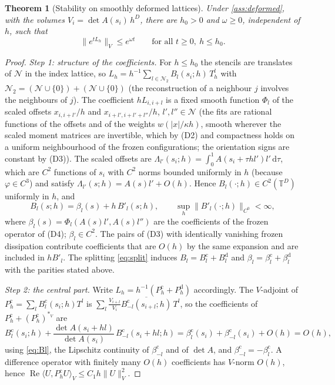 \documentclass[11pt,a4paper]{article}
\theoremstyle{plain}
\newtheorem{theorem}{Theorem}[section]
\theoremstyle{definition}
\theoremstyle{remark}
\numberwithin{equation}{section}
\newcommand{\T}{\mathbb{T}}
\newcommand{\dd}{\mathrm{d}}
\renewcommand{\Re}{\operatorname{Re}}
\begin{document}
\begin{theorem}[Stability on smoothly deformed lattices]\label{thm:deformed}
Under \cref{ass:deformed}, with the volumes $V_i=\det A(s_i)\,h^D$, there are $h_0>0$ and $\omega\ge0$, independent of $h$, such that
\begin{equation}\label{eq:deformed}
\|e^{tL_h}\|_V\le e^{\omega t}\qquad\text{for all }t\ge0,\ h\le h_0 .
\end{equation}
\end{theorem}

\begin{proof}
\emph{Step 1: structure of the coefficients.} For $h\le h_0$ the stencils are translates of $\mathcal N$ in the index lattice, so $L_h=h^{-1}\sum_{l\in\mathcal N_2}B_l(s_i;h)\,T^l_h$ with $\mathcal N_2=(\mathcal N\cup\{0\})+(\mathcal N\cup\{0\})$ (the reconstruction of a neighbour $j$ involves the neighbours of $j$). The coefficient $hL_{i,i+l}$ is a fixed smooth function $\Phi_l$ of the scaled offsets $x_{i,i+l'}/h$ and $x_{i+l',i+l'+l''}/h$, $l',l''\in\mathcal N$ (the fits are rational functions of the offsets and of the weights $w(|x|/\kappa h)$, smooth wherever the scaled moment matrices are invertible, which by (D2) and compactness holds on a uniform neighbourhood of the frozen configurations; the orientation signs are constant by (D3)). The scaled offsets are $\Lambda_{l'}(s_i;h)=\int_0^1A(s_i+\tau hl')l'\,\dd\tau$, which are $C^2$ functions of $s_i$ with $C^2$ norms bounded uniformly in $h$ (because $\varphi\in C^3$) and satisfy $\Lambda_{l'}(s;h)=A(s)l'+O(h)$. Hence $B_l(\cdot;h)\in C^2(\T^D)$ uniformly in $h$, and
\begin{equation}\label{eq:Bl}
B_l(s;h)=\beta_l(s)+h\,B'_l(s;h),\qquad \sup_h\|B'_l(\cdot;h)\|_{C^0}<\infty,
\end{equation}
where $\beta_l(s)=\Phi_l(A(s)l',A(s)l'')$ are the coefficients of the frozen operator of (D4); $\beta_l\in C^2$. The pairs of (D3) with identically vanishing frozen dissipation contribute coefficients that are $O(h)$ by the same expansion and are included in $hB'_l$. The splitting \eqref{eq:split} induces $B_l=B^{\mathrm c}_l+B^{\mathrm d}_l$ and $\beta_l=\beta^{\mathrm c}_l+\beta^{\mathrm d}_l$ with the parities stated above.

\emph{Step 2: the central part.} Write $L_h=h^{-1}(P^{\mathrm c}_h+P^{\mathrm d}_h)$ accordingly. The $V$-adjoint of $P^{\mathrm c}_h=\sum_lB^{\mathrm c}_l(s_i;h)T^l$ is $\sum_l\frac{V_{i+l}}{V_i}\overline{B^{\mathrm c}_{-l}(s_{i+l};h)}\,T^l$, so the coefficients of $P^{\mathrm c}_h+(P^{\mathrm c}_h)^{*_V}$ are
\[
B^{\mathrm c}_l(s_i;h)+\frac{\det A(s_i+hl)}{\det A(s_i)}\,B^{\mathrm c}_{-l}(s_i+hl;h)
=\beta^{\mathrm c}_l(s_i)+\beta^{\mathrm c}_{-l}(s_i)+O(h)=O(h),
\]
using \eqref{eq:Bl}, the Lipschitz continuity of $\beta^{\mathrm c}_{-l}$ and of $\det A$, and $\beta^{\mathrm c}_{-l}=-\beta^{\mathrm c}_l$. A difference operator with finitely many $O(h)$ coefficients has $V$-norm $O(h)$, hence $\Re\langle U,P^{\mathrm c}_hU\rangle_V\le C_1h\|U\|_V^2$.


\end{proof}
\end{document}
